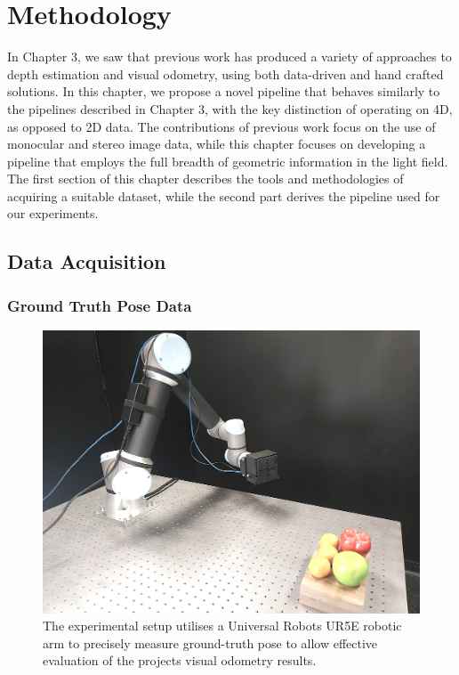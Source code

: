 \chapter{Methodology}

In Chapter 3, we saw that previous work has produced a variety of approaches to depth estimation and visual odometry, using both data-driven and hand crafted solutions. In this chapter, we propose a novel pipeline that behaves similarly to the pipelines described in Chapter 3, with the key distinction of operating on 4D, as opposed to 2D data. The contributions of previous work focus on the use of monocular and stereo image data, while this chapter focuses on developing a pipeline that employs the full breadth of geometric information in the light field. The first section of this chapter describes the tools and methodologies of acquiring a suitable dataset, while the second part derives the pipeline used for our experiments.

\section{Data Acquisition}

\subsection{Ground Truth Pose Data}

\begin{figure}[h]
    \centering 
    \includegraphics[width=4.5in]{images/experimentalsetup2.jpg}
    \caption{The experimental setup utilises a Universal Robots UR5E robotic arm to precisely measure ground-truth pose to allow effective evaluation of the projects visual odometry results.}
\end{figure}

